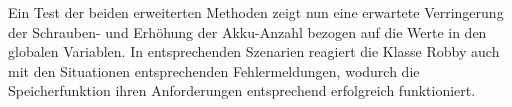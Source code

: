 Ein Test der beiden erweiterten Methoden zeigt nun eine erwartete Verringerung der Schrauben- und Erhöhung der Akku-Anzahl bezogen auf die Werte in den globalen Variablen. In entsprechenden Szenarien reagiert die Klasse Robby auch mit den Situationen entsprechenden Fehlermeldungen, wodurch die Speicherfunktion ihren Anforderungen entsprechend erfolgreich funktioniert.
